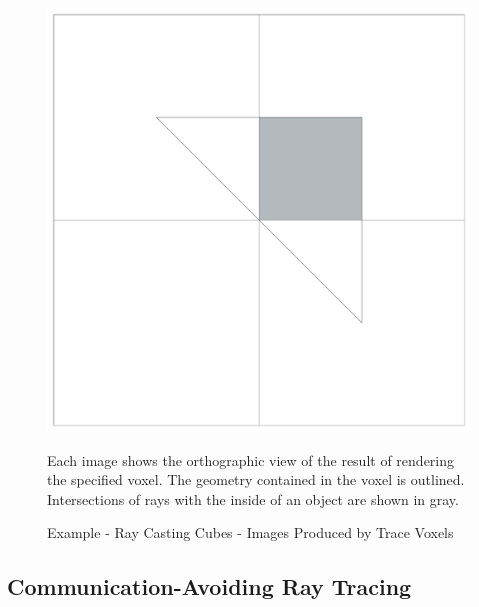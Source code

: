 \begin{figure}[!htb]
  \includegraphics[width=\linewidth]{drawings/examples/cube_example/cubes_08.pdf}
\endminipage



\begin{flushleft}\caption{Example - Ray Casting Cubes - Images Produced by
Trace Voxels}{Each image shows the orthographic view of the result of rendering the
specified voxel.  The geometry contained in the voxel is outlined. 
Intersections of rays with the inside of an object are shown in gray.}
\label{fig:cubes_example}
\end{flushleft}%
\end{figure}
\subsection{Communication-Avoiding Ray Tracing}
\label{sec:ca-ray-tracing}


